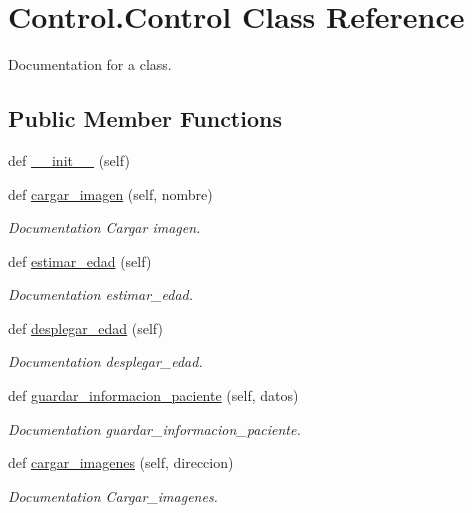 \hypertarget{class_control_1_1_control}{}\section{Control.\+Control Class Reference}
\label{class_control_1_1_control}


Documentation for a class.  


\subsection*{Public Member Functions}
\begin{DoxyCompactItemize}
\item 
def \mbox{\hyperlink{class_control_1_1_control_acbf9737a141c25fda2909c24f68cb75e}{\+\_\+\+\_\+init\+\_\+\+\_\+}} (self)
\item 
def \mbox{\hyperlink{class_control_1_1_control_aae955f5fe750e5f2d2764ff3893b75f5}{cargar\+\_\+imagen}} (self, nombre)
\begin{DoxyCompactList}\small\item\em Documentation Cargar imagen. \end{DoxyCompactList}\item 
def \mbox{\hyperlink{class_control_1_1_control_a214b0abae8fa56b8a6e4dae3cd053e7d}{estimar\+\_\+edad}} (self)
\begin{DoxyCompactList}\small\item\em Documentation estimar\+\_\+edad. \end{DoxyCompactList}\item 
def \mbox{\hyperlink{class_control_1_1_control_a5c05a607e82b93298524f090feaa2397}{desplegar\+\_\+edad}} (self)
\begin{DoxyCompactList}\small\item\em Documentation desplegar\+\_\+edad. \end{DoxyCompactList}\item 
def \mbox{\hyperlink{class_control_1_1_control_a0690ce69225a0122530a105210b961b8}{guardar\+\_\+informacion\+\_\+paciente}} (self, datos)
\begin{DoxyCompactList}\small\item\em Documentation guardar\+\_\+informacion\+\_\+paciente. \end{DoxyCompactList}\item 
def \mbox{\hyperlink{class_control_1_1_control_a56cb5407904ea4d004d3bb3faa7c0549}{cargar\+\_\+imagenes}} (self, direccion)
\begin{DoxyCompactList}\small\item\em Documentation Cargar\+\_\+imagenes. \end{DoxyCompactList}\item 

\end{DoxyCompactItemize}
